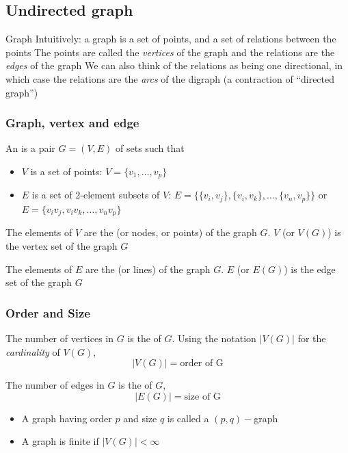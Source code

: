 \documentclass[aspectratio=43]{beamer}
\begin{document}
\subsection{Undirected graph}


\begin{frame}{Graph}
	Intuitively: a graph is a set of points, and a set of relations between the points
	\vfill
	The points are called the \emph{vertices} of the graph and the relations are the \emph{edges} of the graph
	\vfill
	We can also think of the relations as being one directional, in which case the relations are the \emph{arcs} of the digraph (a contraction of ``directed graph'')
\end{frame}


\begin{frame}\frametitle{Graph, vertex and edge} 
	\begin{definition}[Graph]
	An  is a pair $G=(V,E)$ of sets such that
	\begin{itemize}
	\item $V$ is a set of points:  $V=\{v_1,\ldots,v_p\}$
	\item $E$ is a set of 2-element subsets of $V$: $E=\{\{v_i,v_j\},\{v_i,v_k\},\ldots,\{v_n,v_p\}\}$ or $E=\{v_iv_j,v_iv_k,\ldots,v_nv_p\}$
	\end{itemize}
	\end{definition}
	\begin{definition}[Vertex]
	The elements of $V$ are the  (or nodes, or points) of the graph $G$.
	$V$ (or $V(G)$) is the vertex set of the graph $G$
	\end{definition}
	\begin{definition}[Edge]
	The elements of $E$ are the  (or lines) of the graph $G$.
	$E$ (or $E(G)$) is the edge set of the graph $G$
	\end{definition}
\end{frame}

\begin{frame}\frametitle{Order and Size}
	\begin{definition}
	The number of vertices in $G$ is the  of $G$. Using the notation $|V(G)|$ for the \emph{cardinality} of $V(G)$,
	$$|V(G)|=\textrm{order of G}$$
	\end{definition}
	\vfill
	\begin{definition}
	The number of edges in $G$ is the  of $G$,
	$$|E(G)|=\textrm{size of G}$$
	\end{definition}
	\vfill
	\begin{itemize}
	\item A graph having order $p$ and size $q$ is called a $(p,q)-$graph
	\item A graph is finite if $|V(G)|<\infty$
	\end{itemize}
\end{frame}
\end{document}
